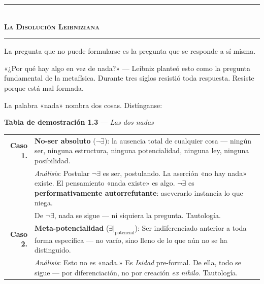\documentclass[10pt, openany, oneside]{book}
\renewcommand{\normalsize}{\fontsize{10}{13}\selectfont}
\begin{document}

\begin{center}
    \rule{0.3\textwidth}{0.4pt}\\[0.5em]
    {\normalsize\bfseries\scshape La Disolución Leibniziana}\\[0.3em]
    \rule{0.3\textwidth}{0.4pt}
\end{center}

\vspace{1em}

\noindent La pregunta que no puede formularse es la pregunta que se responde a sí misma.

«¿Por qué hay algo en vez de nada?» --- Leibniz planteó esto como la pregunta fundamental de la metafísica. Durante tres siglos resistió toda respuesta. Resiste porque está mal formada.

La palabra «nada» nombra dos cosas. Distínganse:

\vspace{0.5em}

\textbf{Tabla de demostración 1.3} --- \textit{Las dos nadas}

\vspace{0.5em}

\noindent\begin{tabular}{r p{}}
\textbf{Caso 1.} & \textbf{No-ser absoluto} ($\neg\exists$): la ausencia total de cualquier cosa --- ningún ser, ninguna estructura, ninguna potencialidad, ninguna ley, ninguna posibilidad. \\[0.3em]
 & \textit{Análisis}: Postular $\neg\exists$ es ser, postulando. La aserción «no hay nada» existe. El pensamiento «nada existe» es algo. $\neg\exists$ es \textbf{performativamente autorrefutante}: aseverarlo instancia lo que niega. \\[0.3em]
 & De $\neg\exists$, nada se sigue --- ni siquiera la pregunta. Tautología. \\[0.5em]
\textbf{Caso 2.} & \textbf{Meta-potencialidad} ($\exists|_{\text{potencial}}$): Ser indiferenciado anterior a toda forma específica --- no vacío, sino lleno de lo que aún no se ha distinguido. \\[0.3em]
 & \textit{Análisis}: Esto no es «nada.» Es \textit{Isidad} pre-formal. De ella, todo se sigue --- por diferenciación, no por creación \textit{ex nihilo}. Tautología. \\[0.3em]
\end{tabular}
\end{document}
